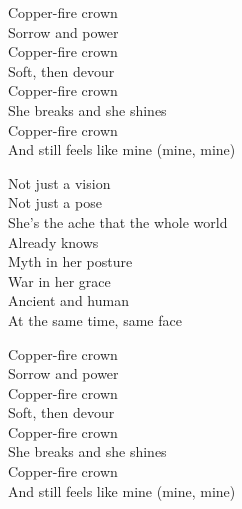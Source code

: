 \begin{lyrics}
Copper-fire crown\\
Sorrow and power\\
Copper-fire crown\\
Soft, then devour\\
Copper-fire crown\\
She breaks and she shines\\
Copper-fire crown\\
And still feels like mine (mine, mine)

Not just a vision\\
Not just a pose\\
She's the ache that the whole world\\
Already knows\\
Myth in her posture\\
War in her grace\\
Ancient and human\\
At the same time, same face

Copper-fire crown\\
Sorrow and power\\
Copper-fire crown\\
Soft, then devour\\
Copper-fire crown\\
She breaks and she shines\\
Copper-fire crown\\
And still feels like mine (mine, mine)
\end{lyrics}

